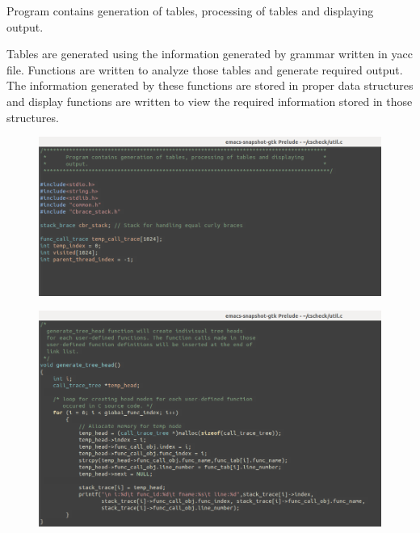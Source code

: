 Program contains generation of tables, processing of tables and displaying	
output.										
 											
Tables are generated using the information generated by grammar written in	
yacc file. Functions are written to analyze those tables and generate		
required output. The information generated by these functions are stored in     
proper data structures and display functions are written to view the required   
information stored in those structures. 

\begin{figure}[H]
\centering
\includegraphics[scale=0.4]{Snaps/util_1.png}
\label{<<Label>>}
\end{figure}

\begin{figure}[H]
\centering
\includegraphics[scale=0.4]{Snaps/util_5.png}
\label{<<Label>>}
\end{figure}

